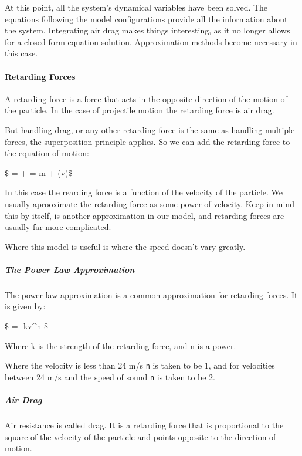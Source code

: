 \documentclass[11pt]{article}
\begin{document}
    At this point, all the system's dynamical variables have been solved.
The equations following the model configurations provide all the
information about the system. Integrating air drag makes things
interesting, as it no longer allows for a closed-form equation solution.
Approximation methods become necessary in this case.

    \hypertarget{retarding-forces}{%
\paragraph{\texorpdfstring{\textbf{Retarding
Forces}}{Retarding Forces}}\label{retarding-forces}}

A retarding force is a force that acts in the opposite direction of the
motion of the particle. In the case of projectile motion the retarding
force is air drag.

But handling drag, or any other retarding force is the same as handling
multiple forces, the superposition principle applies. So we can add the
retarding force to the equation of motion:

\$ \sum {} =  +  = m + (v)\$

In this case the rearding force is a function of the velocity of the
particle. We usually aprooximate the retarding force as some power of
velocity. Keep in mind this by itself, is another approximation in our
model, and retarding forces are usually far more complicated.

Where this model is useful is where the speed doesn't vary greatly.

\hypertarget{the-power-law-approximation}{%
\subparagraph{\texorpdfstring{\textbf{The Power Law
Approximation}}{The Power Law Approximation}}\label{the-power-law-approximation}}

The power law approximation is a common approximation for retarding
forces. It is given by:

\$  = -kv\^{}n \$

Where k is the strength of the retarding force, and n is a power.

Where the velocity is less than 24 m/s \texttt{n} is taken to be 1, and
for velocities between 24 m/s and the speed of sound \texttt{n} is taken
to be 2.

\hypertarget{air-drag}{%
\subparagraph{\texorpdfstring{\textbf{Air
Drag}}{Air Drag}}\label{air-drag}}

Air resistance is called drag. It is a retarding force that is
proportional to the square of the velocity of the particle and points
opposite to the direction of motion.
\end{document}
